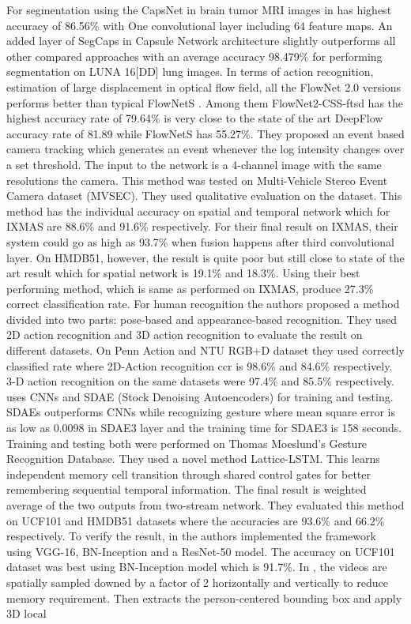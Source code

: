 \documentclass[11pt,english]{article}
\begin{document}
For segmentation using the CapsNet in brain tumor MRI images in \citep{afshar2018brain} has highest accuracy of 86.56\% with  One convolutional layer including 64 feature maps. An added layer of SegCaps in Capsule Network architecture\citep{lalonde2018capsules} slightly outperforms all other compared approaches with an average accuracy 98.479\% for performing segmentation on LUNA 16[DD] lung images. In terms of action recognition, estimation of large displacement in optical flow field, all the FlowNet 2.0 \citep{ilg2017flownet} versions performs better than typical FlowNetS \citep{dosovitskiy2015flownet}. Among them FlowNet2-CSS-ftsd has the highest accuracy rate of 79.64\% is very close to the state of the art DeepFlow\citep{weinzaepfel2013deepflow} accuracy rate of 81.89 while FlowNetS has 55.27\%. \citep{zhu2018ev} They proposed an event based camera tracking which generates an event whenever the log intensity changes over a set threshold. The input to the network is a 4-channel image with the same resolutions the camera. This method was tested on Multi-Vehicle Stereo Event Camera dataset (MVSEC). They used qualitative evaluation on the dataset. \citep{chen2017semi} This method has the individual accuracy on spatial and temporal network which for IXMAS are 88.6\% and 91.6\% respectively. For their final result on IXMAS, their system could go as high as 93.7\% when fusion happens after third convolutional layer. On HMDB51, however, the result is quite poor but still close to state of the art result which for spatial network is 19.1\% and 18.3\%. Using their best performing method, which is same as performed on IXMAS, produce 27.3\% correct classification rate. \citep{luvizon20182d} For human recognition the authors proposed a method divided into two parts: pose-based and appearance-based recognition. They used 2D action recognition and 3D action recognition to evaluate the result on different datasets. On Penn Action and NTU RGB+D dataset they used correctly classified rate where 2D-Action recognition ccr is 98.6\% and 84.6\% respectively. 3-D action recognition on the same datasets were 97.4\% and 85.5\% respectively. \citep{oyedotun2017deep} uses CNNs and SDAE (Stock Denoising Autoencoders) for training and testing. SDAEs outperforms CNNs while recognizing gesture where mean square error is as low as 0.0098 in SDAE3 layer and the training time for SDAE3 is 158 seconds. Training and testing both were performed on Thomas Moeslund's Gesture Recognition Database. \citep{sun2017lattice} They used a novel method Lattice-LSTM. This learns independent memory cell transition through shared control gates for better remembering sequential temporal information. The final result is weighted average of the two outputs from two-stream network. They evaluated this method on UCF101 and HMDB51 datasets where the accuracies are 93.6\% and 66.2\% respectively. To verify the result, in \citep{wang2017spatiotemporal} the authors implemented the framework using VGG-16, BN-Inception and a ResNet-50 model. The accuracy on UCF101 dataset was best using BN-Inception model which is 91.7\%. In \citep{jegou2017one}, the videos are spatially sampled downed by a factor of 2 horizontally and vertically to reduce memory requirement. Then extracts the person-centered bounding box and apply 3D local 
\end{document}
